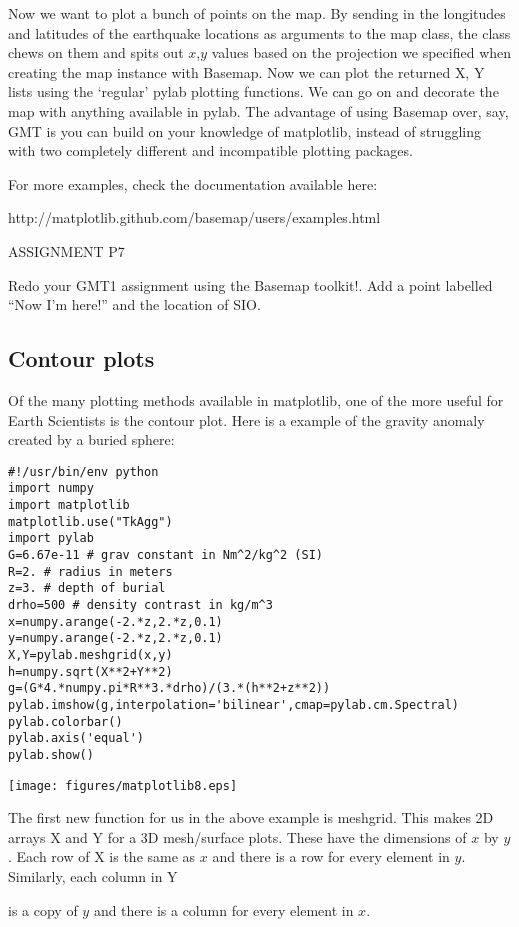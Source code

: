 {{Now we want to plot a bunch of points on the map.  By sending in the longitudes and latitudes of the earthquake locations as arguments to the map class, the class chews on them and spits out $x$,$y$ values based on the projection we specified when creating the map instance with Basemap.  Now we can plot the returned {\color{blue}X, Y} lists using the `regular' {\color{blue}pylab} plotting functions.  We can go on and decorate the map with anything available in {\color{blue}pylab}.  
The advantage of using {\color{blue}Basemap} over, say, GMT is you can build on your knowledge of {\color{blue}matplotlib}, instead of struggling with two completely different and incompatible plotting packages.  

For more examples, check the documentation available here: 

http://matplotlib.github.com/basemap/users/examples.html



{\color{red}

\noindent ASSIGNMENT P7

Redo your GMT1 assignment using the {\color{blue}Basemap} toolkit!.  Add a point labelled ``Now I'm here!'' and the location of SIO.
}


\subsection{Contour plots}

Of the many plotting methods available in {\color{blue}matplotlib}, one of the more useful for Earth Scientists is the contour plot.  Here is a example of the gravity anomaly created by a buried sphere:


{\singlespacing \color{blue}\begin{verbatim}
#!/usr/bin/env python
import numpy
import matplotlib
matplotlib.use("TkAgg")
import pylab
G=6.67e-11 # grav constant in Nm^2/kg^2 (SI)
R=2. # radius in meters
z=3. # depth of burial
drho=500 # density contrast in kg/m^3
x=numpy.arange(-2.*z,2.*z,0.1)
y=numpy.arange(-2.*z,2.*z,0.1)
X,Y=pylab.meshgrid(x,y)
h=numpy.sqrt(X**2+Y**2) 
g=(G*4.*numpy.pi*R**3.*drho)/(3.*(h**2+z**2))
pylab.imshow(g,interpolation='bilinear',cmap=pylab.cm.Spectral)
pylab.colorbar()
pylab.axis('equal')
pylab.show()
\end{verbatim}}


{\texttt{[image: figures/matplotlib8.eps]}}

The first new function for us in the above example is {\color{blue}meshgrid}.  This makes 2D arrays {\color{blue}X} and {\color{blue}Y}  for a 3D mesh/surface plots.    These have the dimensions of $x$ by $y$.  Each row of {\color{blue}X} is the same as $x$ and there is a row for every element in $y$. Similarly, each column in  \color{blue}Y} is a copy of $y$ and there is a column for every element in $x$.  

}
